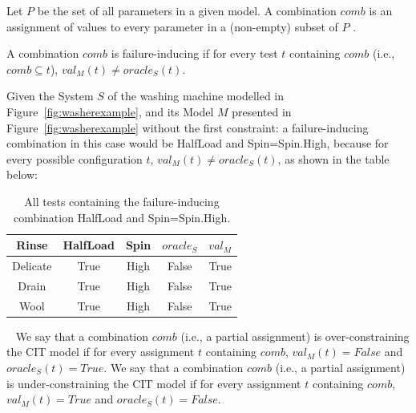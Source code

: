 \begin{tikzborder}{\cite{Gargantini16:validation}}
\begin{tikzborder}{\cite{gargantini_combinatorial_2017}}
\bb
\begin{defn}[Combination]\label{def:cobo}
	Let $P$ be the set of all parameters in a given model. A combination $comb$ is an assignment of values to every parameter in a (non-empty) subset of $P$ . %
\end{defn}


\begin{defn}
	\label{def:failureinducing}
	A combination $comb$ is failure-inducing if for every test $t$ containing $comb$ (i.e., $comb \subseteq t$), $val_{M}(t) \neq \mathit{oracle}_{S}(t)$.
\end{defn}
\be

\begin{example}\label{ex:ficombo_constraining}
	\bb Given the System $S$ of the washing machine modelled in Figure~\ref{fig:washerexample}, and its Model $M$ presented in Figure~\ref{fig:washerexample} without the first constraint: a failure-inducing combination in this case would be HalfLoad and Spin=Spin.High, because for every possible configuration $t$, $val_M(t) \neq \mathit{oracle}_{S}(t)$, as shown in the table below:\be
	
	\begin{table}[h]
		\centering
		\begin{tabular}{ccc|cc}
			Rinse & HalfLoad & Spin & $\mathit{oracle}_{S}$ & $val_M$ \\
			\hline 
			Delicate & True & High & False & True \\ 
			Drain & True & High& False & True \\ 
			Wool & True & High & False & True \\
		\end{tabular} \label{tab:failureInducingExample} \caption{All tests containing the failure-inducing combination HalfLoad and Spin=Spin.High.}
	\end{table}
\end{example}

\bb
\begin{defn}\
	\label{def:correctness2} 
	We say that a combination $comb$ (i.e., a partial assignment) is over-constraining the CIT model if for every assignment $t$ containing $comb$,  $val_{M}(t)=\mathit{False}$ and $\mathit{oracle}_{S}(t)=\mathit{True}$.
	We say that a combination $comb$ (i.e., a partial assignment) is under-constraining the CIT model if for every assignment $t$ containing $comb$,  $val_{M}(t)=\mathit{True}$ and $\mathit{oracle}_{S}(t)=\mathit{False}$.
\end{defn}


\end{tikzborder}
\end{tikzborder}
